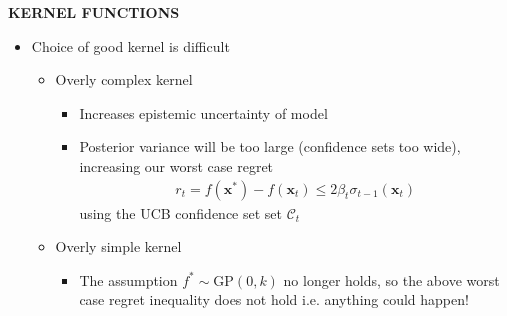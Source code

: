 \begin{whitebox}{\textbf{KERNEL FUNCTIONS}}
\begin{itemize}
\begin{itemize}
\begin{itemize}
\begin{center}
{                        page=20,
                        trim = {11.3cm, 5.0cm, 2.35cm, 4.8cm}, %
                        clip
                        ]{media/22HS_Tut08_BO.pdf}
                    }
                \end{center}
                \item Note: this is just a worst case guarantee, so it does not necessarily imply that the algorithm will always do worse (average case will be smoother than the worst case sample)
            \end{itemize}
            \item Choice of good kernel is difficult
            \begin{itemize}
                \item Overly complex kernel
                \begin{itemize}
                    \item Increases epistemic uncertainty of model
                    \item Posterior variance will be too large (confidence sets too wide), increasing our worst case regret
                    \begin{align*}
                        r_t=f(\bm{x}^*)-f(\bm{x}_t)\leq 2\beta_t\sigma_{t-1}(\bm{x}_t)
                    \end{align*}
                    using the UCB confidence set set $\mathcal{C}_t$
                \end{itemize}
                \item Overly simple kernel
                \begin{itemize}
                    \item The assumption $f^*\sim\mathrm{GP}(0,k)$ no longer holds, so the above worst case regret inequality does not hold i.e. anything could happen!
                \end{itemize}
                \begin{center}
                \end{center}
            \end{itemize}
        \end{itemize}
    \end{itemize}
\end{whitebox}